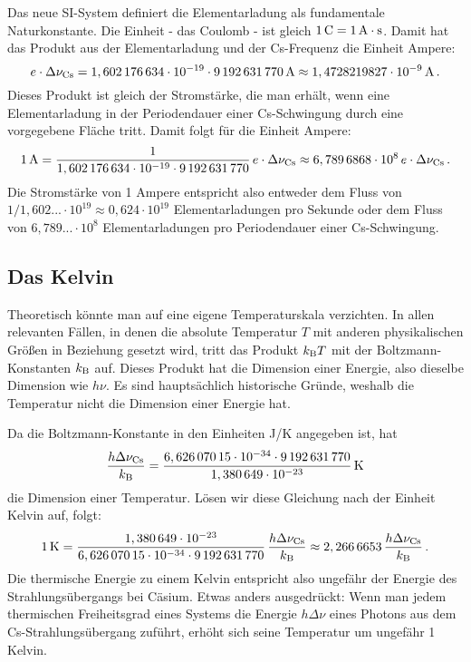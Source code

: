 Das neue SI-System definiert die Elementarladung als fundamentale Naturkonstante. 
Die Einheit - das Coulomb - ist gleich $1 \, {\rm C= 1\, A \cdot s}$. Damit hat das Produkt aus der
Elementarladung und der Cs-Frequenz die Einheit Ampere:
\begin{equation}
       e \cdot \Delta \nu_{\rm Cs} = 1,602\,176\,634 \cdot 10^{-19} \cdot 9\,192\,631\,770\, {\rm A} \approx
            1,4728219827 \cdot 10^{-9} \,{\rm A} \, .
\end{equation}
Dieses Produkt ist gleich der Stromst\"arke, die man erh\"alt, wenn eine Elementarladung in der Periodendauer 
einer Cs-Schwingung durch eine vorgegebene Fl\"ache tritt. Damit folgt f\"ur die Einheit Ampere:
\begin{equation}
     1\,{\rm A} = \frac{1}{1,602\,176\,634 \cdot 10^{-19} \cdot 9\,192\,631\,770} \, e \cdot \Delta \nu_{\rm Cs} \approx
           6,789\,6868 \cdot 10^8 \,  e \cdot \Delta \nu_{\rm Cs} \, .
\end{equation}
Die Stromst\"arke von 1 Ampere entspricht also entweder dem Fluss von 
$1/1,602...\cdot 10^{19} \approx 0,624\cdot 10^{19}$ 
Elementarladungen pro Sekunde oder dem Fluss von $6,789... \cdot 10^8$ Elementarladungen
pro Periodendauer einer Cs-Schwingung. 

\subsection{Das Kelvin}

Theoretisch k\"onnte man auf eine eigene Temperaturskala verzichten. In allen relevanten
F\"allen, in denen die absolute Temperatur $T$ mit anderen physikalischen Gr\"o\ss en in Beziehung
gesetzt wird, tritt das Produkt $k_{\rm B}T$ mit der Boltzmann-Konstanten $k_{\rm B}$ 
auf. Dieses Produkt hat die Dimension einer Energie, also
dieselbe Dimension wie $h\nu$. Es sind haupts\"achlich historische Gr\"unde, weshalb die
Temperatur nicht die Dimension einer Energie hat. 

Da die Boltzmann-Konstante in den Einheiten J/K angegeben
ist, hat
\begin{equation}
    \frac{h \Delta \nu_{\rm Cs}}{k_{\rm B}} = 
    \frac{6,626\,070\,15 \cdot 10^{-34} \cdot 9\,192\,631\,770}{1,380\,649 \cdot 10^{-23}} \, {\rm K}
\end{equation}
die Dimension einer Temperatur. L\"osen wir diese Gleichung nach der Einheit Kelvin auf, folgt:
\begin{equation}
   1\,{\rm K} =      \frac{1,380\,649 \cdot 10^{-23}}{6,626\,070\,15 \cdot 10^{-34} \cdot 9\,192\,631\,770} \, 
    \frac{h \Delta \nu_{\rm Cs}}{k_{\rm B}} \approx 2,266\,6653 \,  \frac{h \Delta \nu_{\rm Cs}}{k_{\rm B}} \, .
\end{equation}
Die thermische Energie zu einem Kelvin entspricht also ungef\"ahr der Energie des Strahlungs\"ubergangs
bei C\"asium. Etwas anders ausgedr\"uckt: Wenn man jedem thermischen Freiheitsgrad eines Systems
die Energie $h \Delta \nu$ eines Photons aus dem Cs-Strahlungs\"ubergang zuf\"uhrt, erh\"oht sich
seine Temperatur um ungef\"ahr 1 Kelvin. 

